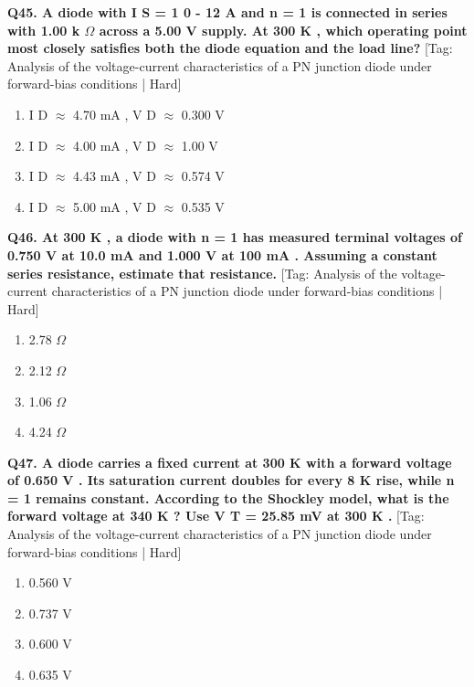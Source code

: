\noindent\textbf{Q45. A diode with I S = 1 0 - 12 A and n = 1 is connected in series with 1.00 k $\Omega$ across a 5.00 V supply. At 300 K , which operating point most closely satisfies both the diode equation and the load line?} \hfill [Tag: Analysis of the voltage-current characteristics of a PN junction diode under forward-bias conditions | Hard]
\begin{enumerate}[label=(\alph*),topsep=2pt,itemsep=1pt,partopsep=0pt,parsep=0pt]
    \item {I D $\approx$ 4.70 mA , V D $\approx$ 0.300 V}
    \item {I D $\approx$ 4.00 mA , V D $\approx$ 1.00 V}
    \item {I D $\approx$ 4.43 mA , V D $\approx$ 0.574 V}
    \item {I D $\approx$ 5.00 mA , V D $\approx$ 0.535 V}
\end{enumerate}
\vspace{2mm}

\noindent\textbf{Q46. At 300 K , a diode with n = 1 has measured terminal voltages of 0.750 V at 10.0 mA and 1.000 V at 100 mA . Assuming a constant series resistance, estimate that resistance.} \hfill [Tag: Analysis of the voltage-current characteristics of a PN junction diode under forward-bias conditions | Hard]
\begin{enumerate}[label=(\alph*),topsep=2pt,itemsep=1pt,partopsep=0pt,parsep=0pt]
    \item {2.78 $\Omega$}
    \item {2.12 $\Omega$}
    \item {1.06 $\Omega$}
    \item {4.24 $\Omega$}
\end{enumerate}
\vspace{2mm}

\noindent\textbf{Q47. A diode carries a fixed current at 300 K with a forward voltage of 0.650 V . Its saturation current doubles for every 8 K rise, while n = 1 remains constant. According to the Shockley model, what is the forward voltage at 340 K ? Use V T = 25.85 mV at 300 K .} \hfill [Tag: Analysis of the voltage-current characteristics of a PN junction diode under forward-bias conditions | Hard]
\begin{enumerate}[label=(\alph*),topsep=2pt,itemsep=1pt,partopsep=0pt,parsep=0pt]
    \item {0.560 V}
    \item {0.737 V}
    \item {0.600 V}
    \item {0.635 V}
\end{enumerate}
\vspace{2mm}

